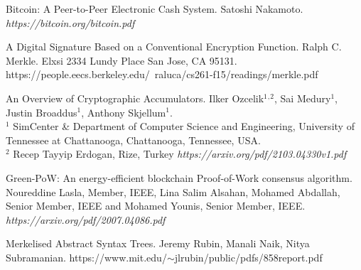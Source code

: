 \documentclass[notitlepage]{article}
\begin{document}
\begin{thebibliography}{9}

Bitcoin: A Peer-to-Peer Electronic Cash System.
Satoshi Nakamoto. \textit{
https://bitcoin.org/bitcoin.pdf
}

A Digital Signature Based on a Conventional Encryption Function.
Ralph C. Merkle.
Elxsi 2334 Lundy Place San Jose, CA 95131.
https://people.eecs.berkeley.edu/~raluca/cs261-f15/readings/merkle.pdf

An Overview of Cryptographic Accumulators.
Ilker Ozcelik$^1$$^,$$^2$, Sai Medury$^1$, Justin Broaddus$^1$, Anthony Skjellum$^1$. \\
$^1$ SimCenter \& Department of Computer Science and Engineering, University of Tennessee at Chattanooga, Chattanooga, Tennessee, USA. \\$^2$ Recep Tayyip Erdogan, Rize, Turkey\textit{
https://arxiv.org/pdf/2103.04330v1.pdf
}

Green-PoW: An energy-efficient blockchain Proof-of-Work consensus algorithm.
Noureddine Lasla, Member, IEEE, Lina Salim Alsahan, Mohamed Abdallah, Senior Member, IEEE
and Mohamed Younis, Senior Member, IEEE.
\textit{
https://arxiv.org/pdf/2007.04086.pdf
}

Merkelised Abstract Syntax Trees.
Jeremy Rubin, Manali Naik, Nitya Subramanian.
https://www.mit.edu/$\sim$jlrubin/public/pdfs/858report.pdf

\end{thebibliography}
\end{document}
